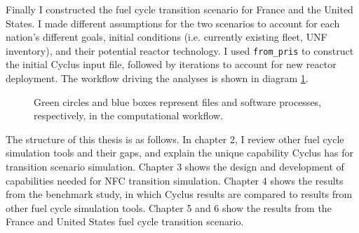 Finally I constructed the fuel cycle transition scenario for France and the United States.
I made different assumptions for the two scenarios to account for each nation's different goals,
initial conditions (i.e. currently existing fleet, \gls{UNF} inventory), and their potential reactor
technology. I used \texttt{from\_pris} to construct the initial Cyclus input file,
followed by iterations to account for new reactor deployment. The workflow driving the analyses is shown in diagram \ref{diag:workflow}.


\begin{figure}
        \centering
{}
\caption{Green circles and blue boxes represent files and software 
processes, respectively, in the computational workflow.}
\label{diag:workflow}
\end{figure}


The structure of this thesis is as follows. In chapter 2, I review other fuel cycle simulation
tools and their gaps, and explain the unique capability Cyclus
has for transition scenario simulation.
Chapter 3 shows the design and
development of capabilities needed for \gls{NFC} transition simulation.
Chapter 4 shows the results from the benchmark study, in which Cyclus results are compared
to results from other fuel cycle simulation tools.
Chapter 5 and 6 show the results from the France and United States fuel cycle
transition scenario.

